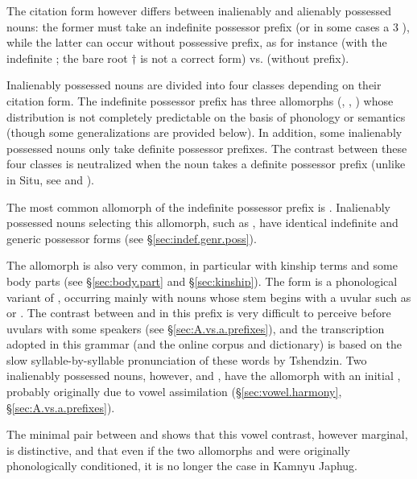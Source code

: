 The citation form however differs between inalienably and alienably possessed nouns: the former must take an indefinite possessor prefix (or in some cases a 3\sg{} ), while the latter can occur without possessive prefix, as for instance  (with the indefinite ; the bare root $\dagger$ is not a correct form) vs.  (without prefix).

Inalienably possessed nouns are divided into four classes depending on their citation form. The indefinite possessor prefix has three allomorphs (, , ) whose distribution is not completely predictable on the basis of phonology or semantics (though some generalizations are provided below). In addition, some inalienably possessed nouns only take definite possessor prefixes. The contrast between these four classes is neutralized when the noun takes a definite possessor prefix (unlike in Situ, see \citealt[168--169]{linxr93jiarong} and \citealt[118--119]{prins16kyomkyo}).

The most common allomorph of the indefinite possessor prefix is . Inalienably possessed nouns selecting this allomorph, such as , have identical indefinite and generic possessor forms (see §\ref{sec:indef.genr.poss}).

The allomorph  is also very common, in particular with kinship terms and some body parts (see §\ref{sec:body.part} and §\ref{sec:kinship}). The form  is a phonological variant of , occurring mainly with nouns whose stem begins with a uvular such as  or . The contrast between  and  in this prefix is very difficult to perceive before uvulars with some speakers (see §\ref{sec:A.vs.a.prefixes}), and the transcription adopted in this grammar (and the online corpus and dictionary) is based on the slow syllable-by-syllable pronunciation of these words by Tshendzin. Two inalienably possessed nouns, however,  and , have the  allomorph with an initial , probably originally due to vowel assimilation (§\ref{sec:vowel.harmony}, §\ref{sec:A.vs.a.prefixes}).

The minimal pair between  and  shows that this vowel contrast, however marginal, is distinctive, and that even if the two allomorphs  and  were originally phonologically conditioned, it is no longer the case in Kamnyu Japhug.

